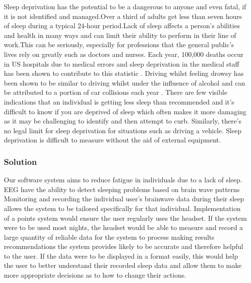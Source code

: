 Sleep deprivation has the potential to be a dangerous to anyone and
even fatal, if it is not identified and managed.Over a third of adults get less than seven hours
of sleep during a typical 24-hour period.Lack of sleep affects a person's abilities and health
in many ways and can limit their ability to perform in their line of work.This can be seriously,
especially for professions that the general public’s lives rely on greatly such as doctors and nurses.
Each year, 100,000 deaths occur in US hospitals due to medical errors and sleep deprivation in the
medical staff has been shown to contribute to this statistic \textcite{Association:2019aa}. Driving whilst feeling drowsy
has been shown to be similar to driving whilst under the influence of alcohol and can be attributed to a
portion of car collisions each year \textcite{foundation:aa}. There are few visible indications that an individual
is getting less sleep than recommended and it’s difficult to know if you are deprived of sleep
which often makes it more damaging as it may be challenging to identify and then attempt to curb.
Similarly, there’s no legal limit for sleep deprivation for situations such as driving a vehicle.
Sleep deprivation is difficult to measure without the aid of external equipment.

\subsubsection{Solution}

Our software system aims to reduce fatigue in individuals due to a lack of sleep.
 EEG have the ability to detect sleeping problems based on brain wave patterns \textcite{Health:2016aa}
 Monitoring and recording the individual user’s brainwave data during their sleep allows the system
 to be tailored specifically for that individual. Implementation of a points system would ensure the
 user regularly uses the headset. If the system were to be used most nights, the headset would be able
 to measure and record a large quantity of reliable data for the system to process making results
 recommendations the system provides likely to be accurate and therefore helpful to the user.
 If the data were to be displayed in a format easily, this would help the user
 to better understand their recorded sleep data and allow them to make more appropriate decisions as to
 how to change their actions.
